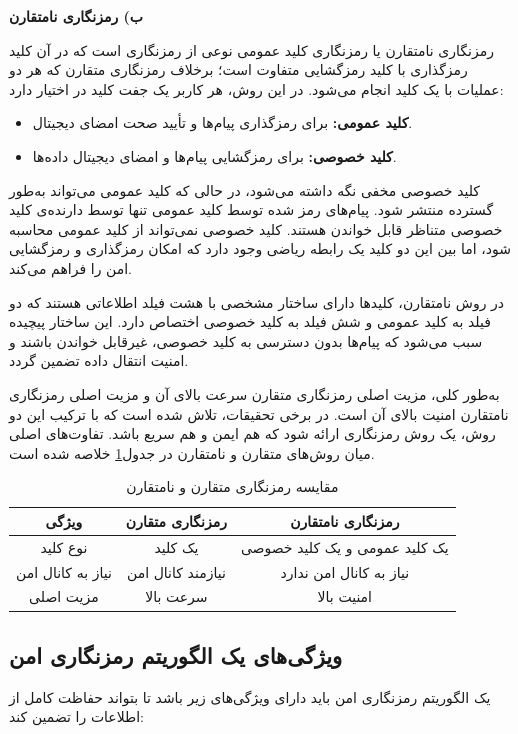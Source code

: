 \textbf{ب) رمزنگاری نامتقارن}

رمزنگاری نامتقارن یا رمزنگاری کلید عمومی نوعی از رمزنگاری است که در آن کلید رمزگذاری با کلید رمزگشایی متفاوت است؛ برخلاف رمزنگاری متقارن که هر دو عملیات با یک کلید انجام می‌شود. در این روش، هر کاربر یک جفت کلید در اختیار دارد:
\begin{itemize}
    \item \textbf{کلید عمومی:} برای رمزگذاری پیام‌ها و تأیید صحت امضای دیجیتال.
    \item \textbf{کلید خصوصی:} برای رمزگشایی پیام‌ها و امضای دیجیتال داده‌ها.
\end{itemize}

کلید خصوصی مخفی نگه داشته می‌شود، در حالی که کلید عمومی می‌تواند به‌طور گسترده منتشر شود. پیام‌های رمز شده توسط کلید عمومی تنها توسط دارنده‌ی کلید خصوصی متناظر قابل خواندن هستند. کلید خصوصی نمی‌تواند از کلید عمومی محاسبه شود، اما بین این دو کلید یک رابطه ریاضی وجود دارد که امکان رمزگذاری و رمزگشایی امن را فراهم می‌کند.

در روش نامتقارن، کلیدها دارای ساختار مشخصی با هشت فیلد اطلاعاتی هستند که دو فیلد به کلید عمومی و شش فیلد به کلید خصوصی اختصاص دارد\cite{ref28}. این ساختار پیچیده سبب می‌شود که پیام‌ها بدون دسترسی به کلید خصوصی، غیرقابل خواندن باشند و امنیت انتقال داده تضمین گردد.

به‌طور کلی، مزیت اصلی رمزنگاری متقارن سرعت بالای آن و مزیت اصلی رمزنگاری نامتقارن امنیت بالای آن است. در برخی تحقیقات، تلاش شده است که با ترکیب این دو روش، یک روش رمزنگاری ارائه شود که هم ایمن و هم سریع باشد\cite{ref29}. تفاوت‌های اصلی میان روش‌های متقارن و نامتقارن در جدول\ref{tab:comparison} خلاصه شده است.

\begin{table}[h]
\centering
\caption{مقایسه رمزنگاری متقارن و نامتقارن} \label{tab:comparison}
\begin{tabular}{|c|c|c|}
\hline
\textbf{ویژگی} & \textbf{رمزنگاری متقارن} & \textbf{رمزنگاری نامتقارن} \\ \hline
نوع کلید & یک کلید & یک کلید عمومی و یک کلید خصوصی \\ \hline
نیاز به کانال امن & نیازمند کانال امن & نیاز به کانال امن ندارد \\ \hline
مزیت اصلی & سرعت بالا & امنیت بالا \\ \hline
\end{tabular}
\end{table}

\subsection{ویژگی‌های یک الگوریتم رمزنگاری امن}
یک الگوریتم رمزنگاری امن باید دارای ویژگی‌های زیر باشد تا بتواند حفاظت کامل از اطلاعات را تضمین کند\cite{ref31}:

